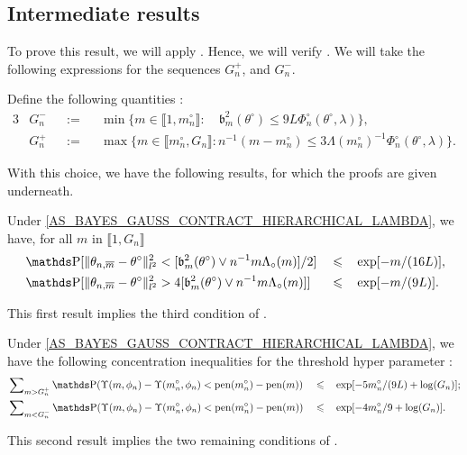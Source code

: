 \subsection{Intermediate results}
To prove this result, we will apply .
Hence, we will verify .
We will take the following expressions for the sequences $G^{+}_{n}$, and $G^{-}_{n}$.
\begin{de}\label{deB.1.1}
Define the following quantities :
\begin{alignat*}{3}
& G_{n}^{-} &&:=&& \min\{m \in \llbracket 1, m_{n}^{\circ} \rrbracket : \quad \mathfrak{b}_{m}^{2}(\theta^{\circ}) \leq 9 L \Phi_{n}^{\circ}(\theta^{\circ}, \lambda)\},\\
& G_{n}^{+} &&:=&& \max \{m \in \llbracket m_{n}^{\circ}, G_{n} \rrbracket : n^{-1}( m - m_{n}^{\circ} ) \leq 3 \Lambda(m_{n}^{\circ})^{-1} \Phi_{n}^{\circ}(\theta^{\circ}, \lambda)\}.
\end{alignat*}
\assEnd
\end{de}

With this choice, we have the following results, for which the proofs are given underneath.

\begin{pr}\label{prB.1.1}
Under \textsc{\cref{AS_BAYES_GAUSS_CONTRACT_HIERARCHICAL_LAMBDA}}, we have, for all $m$ in $\llbracket 1, G_{n} \rrbracket$
\begin{alignat*}{3}
&\P[\Vert \theta_{n, \overline{m}} - \theta^{\circ} \Vert_{l^{2}}^{2} < [\mathfrak{b}_{m}^{2}(\theta^{\circ}) \vee n^{-1}m \Lambda_{\circ}(m)]/2] &&\leq&& \exp[-m/(16 L)],\\
&\P[\Vert \theta_{n, \overline{m}} - \theta^{\circ} \Vert_{l^{2}}^{2} > 4 [\mathfrak{b}_{m}^{2}(\theta^{\circ}) \vee n^{-1}m \Lambda_{\circ}(m)]] &&\leq&& \exp[-m/(9 L)].
\end{alignat*}
\reEnd
\end{pr}
This first result implies the third condition of .

\begin{pr}\label{prB.1.2}
Under \textsc{\cref{AS_BAYES_GAUSS_CONTRACT_HIERARCHICAL_LAMBDA}}, we have the following concentration inequalities for the threshold hyper parameter :
\begin{alignat*}{3}
& \sum\nolimits_{m > G^{+}_{n}} \P(\Upsilon(m, \phi_{n}) - \Upsilon(m^{\circ}_{n}, \phi_{n}) < \pen(m^{\circ}_{n}) - \pen(m)) && \leq && \exp[- 5 m_{n}^{\circ}/(9 L) + \log (G_{n})];\\
& \sum\nolimits_{m < G^{-}_{n}} \P(\Upsilon(m, \phi_{n}) - \Upsilon(m^{\circ}_{n}, \phi_{n}) < \pen(m^{\circ}_{n}) - \pen(m)) && \leq && \exp[- 4 m_{n}^{\circ}/9 + \log (G_{n})].
\end{alignat*}
\reEnd
\end{pr}
This second result implies the two remaining conditions of .

